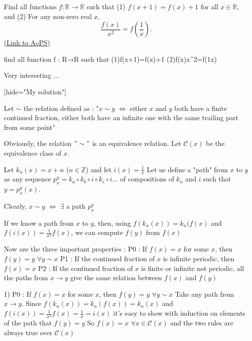 \begin{problem}
	Find all functions $f: \mathbb R \to \mathbb R$ such that
(1) $f(x+1)=f(x)+1$ for all $x \in \mathbb R$, and
(2) For any non-zero real $x$,
\[\frac{f(x)}{x^2}=f\left(\frac 1x\right).\]
	\flushright \href{https://artofproblemsolving.com/community/c6h122010}{(Link to AoPS)}
\end{problem}



\begin{solution}
	\begin{tcolorbox}find all function f : R→R such that
(1)f(x+1)=f(x)+1
(2)f(x)\/x^2=f(1\/x)\end{tcolorbox}

Very interesting ...

[hide="My solution"]

Let $ \sim$ the relation defined as : "$ x\sim y$ $ \iff$ either $ x$ and $ y$ both have a finite continued fraction, either both have an infinite one with the same trailing part from some point"

Obviously, the relation $ "\sim"$ is an equivalence relation. Let $ \mathcal C(x)$ be the equivalence class of $ x$.

Let $ k_n(x)=x+n$ ($ n\in\mathbb Z$) and let $ i(x)=\frac{1}{x}$
Let us define a "path" from $ x$ to $ y$ as any sequence $ p_x^y=k_a\circ k_b\circ i\circ k_c \circ i ...$ of compositions of $ k_n$ and $ i$ such that $ y=p_x^y(x)$. 

Clearly, $ x\sim y$ $ \iff$ $ \exists$ a path $ p_x^y$

If we know a path from $ x$ to $ y$, then, using $ f(k_n(x))=k_n(f(x)$ and $ f(i(x))=\frac{1}{x^2}f(x)$, we can compute $ f(y)$ from $ f(x)$

Now are the three important properties :
P0 : If $ f(x)=x$ for some $ x$, then $ f(y)=y$ $ \forall y\sim x$
P1 : If the continued fraction of $ x$ is infinite periodic, then $ f(x)=x$
P2 : If the continued fraction of $ x$ is finite or infinite not periodic, all the paths from $ x\to y$ give the same relation between $ f(x)$ and $ f(y)$

1) P0 : If $ f(x)=x$ for some $ x$, then $ f(y)=y$ $ \forall y\sim x$
Take any path from $ x\to y$. Since $ f(k_n(x))=k_n(f(x))=k_n(x)$ and $ f(i(x))=\frac{1}{x^2}f(x)=\frac{1}{x}=i(x)$ it's easy to show with induction on elements of the path that $ f(y)=y$
So $ f(x)=x$ $ \forall x\in\mathcal C(x)$ and the two rules are always true over $ \mathcal C(x)$


\end{solution}
